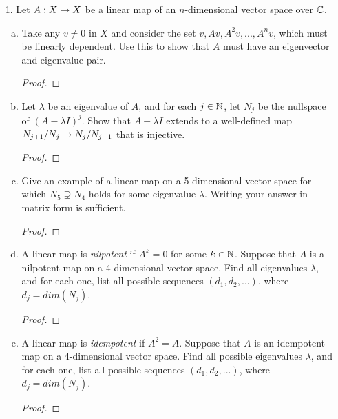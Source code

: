 
\begin{itemize}

\item[1.] Let $A: X \rightarrow X$ be a linear map of an $n$-dimensional vector space over $\mathbb{C}$.
\begin{enumerate}[(a)]
\item Take any $v \neq 0$ in $X$  and consider the set $v, Av, A^2v, ... , A^nv$, which
must be linearly dependent. Use this to show that $A$ must have an eigenvector
and eigenvalue pair.
\begin{proof}

\end{proof}

\item Let $\lambda$ be an eigenvalue of $A$, and for each $j \in \mathbb{N}$, let $N_j$ be the
nullspace of $(A - \lambda I)^j$. Show that $A - \lambda I$ extends to a well-defined map $N_{j+1}/N_j \rightarrow N_j/N_{j-1}$ that is injective.
\begin{proof}

\end{proof}

\item Give an example of a linear map on a 5-dimensional vector space for
which $N_5 \supsetneq N_4$ holds for some eigenvalue $\lambda$. Writing your answer in matrix
form is sufficient.
\begin{proof}

\end{proof}

\item A linear map is \textit{nilpotent} if $A^k = 0$ for some $k \in \mathbb{N}$. Suppose that $A$ is
a nilpotent map on a 4-dimensional vector space. Find all eigenvalues $\lambda$, and
for each one, list all possible sequences $(d_1, d_2, . . .)$, where $d_j = dim(N_j )$.
\begin{proof}

\end{proof}

\item A linear map is \textit{idempotent} if $A^2 = A$. Suppose that $A$ is an idempotent
map on a 4-dimensional vector space. Find all possible eigenvalues $\lambda$, and
for each one, list all possible sequences $(d_1, d_2, . . .)$, where $d_j = dim(N_j )$.
\begin{proof}

\end{proof}
\end{enumerate}







\end{itemize}
